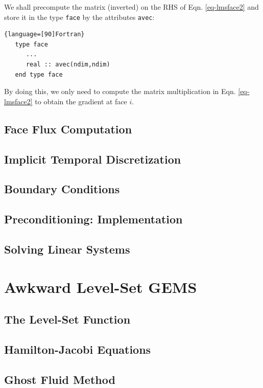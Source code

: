 \documentclass[12pt, letterpaper]{report}
\begin{document}
We shall precompute the matrix (inverted) on the RHS of Eqn. \ref{eq-lmsface2} and store it in the
type \verb+face+ by the attributes \verb+avec+:

\begin{lstlisting}{language=[90]Fortran}
   type face
      ...
      real :: avec(ndim,ndim)
   end type face
\end{lstlisting}

By doing this, we only need to compute the matrix multiplication in Eqn. \ref{eq-lmsface2} to obtain
the gradient at face $i$.

\paraspace
\section{Face Flux Computation}

\section{Implicit Temporal Discretization}

\section{Boundary Conditions}

\section{Preconditioning: Implementation}

\section{Solving Linear Systems}

\chapter{Awkward Level-Set GEMS}

\section{The Level-Set Function}

\section{Hamilton-Jacobi Equations}

\section{Ghost Fluid Method}
\end{document}
